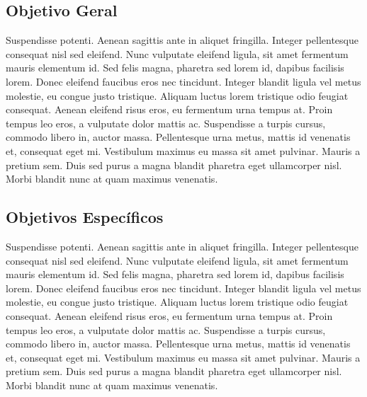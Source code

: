 \subsection{Objetivo Geral}

Suspendisse potenti. Aenean sagittis ante in aliquet fringilla. Integer pellentesque consequat nisl sed eleifend. Nunc vulputate eleifend ligula, sit amet fermentum mauris elementum id. Sed felis magna, pharetra sed lorem id, dapibus facilisis lorem. Donec eleifend faucibus eros nec tincidunt. Integer blandit ligula vel metus molestie, eu congue justo tristique. Aliquam luctus lorem tristique odio feugiat consequat. Aenean eleifend risus eros, eu fermentum urna tempus at. Proin tempus leo eros, a vulputate dolor mattis ac. Suspendisse a turpis cursus, commodo libero in, auctor massa. Pellentesque urna metus, mattis id venenatis et, consequat eget mi. Vestibulum maximus eu massa sit amet pulvinar. Mauris a pretium sem. Duis sed purus a magna blandit pharetra eget ullamcorper nisl. Morbi blandit nunc at quam maximus venenatis.

\subsection{Objetivos Específicos}

Suspendisse potenti. Aenean sagittis ante in aliquet fringilla. Integer pellentesque consequat nisl sed eleifend. Nunc vulputate eleifend ligula, sit amet fermentum mauris elementum id. Sed felis magna, pharetra sed lorem id, dapibus facilisis lorem. Donec eleifend faucibus eros nec tincidunt. Integer blandit ligula vel metus molestie, eu congue justo tristique. Aliquam luctus lorem tristique odio feugiat consequat. Aenean eleifend risus eros, eu fermentum urna tempus at. Proin tempus leo eros, a vulputate dolor mattis ac. Suspendisse a turpis cursus, commodo libero in, auctor massa. Pellentesque urna metus, mattis id venenatis et, consequat eget mi. Vestibulum maximus eu massa sit amet pulvinar. Mauris a pretium sem. Duis sed purus a magna blandit pharetra eget ullamcorper nisl. Morbi blandit nunc at quam maximus venenatis.
